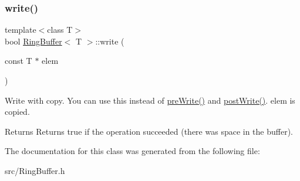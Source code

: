 \subsubsection{\texorpdfstring{write()}{write()}}
{\footnotesize\ttfamily template$<$class T$>$ \\
bool \mbox{\hyperlink{class_ring_buffer}{Ring\+Buffer}}$<$ T $>$\+::write (\begin{DoxyParamCaption}\item[{const T $\ast$}]{elem }\end{DoxyParamCaption})\hspace{0.3cm}{\ttfamily [inline]}}



Write with copy. You can use this instead of \mbox{\hyperlink{class_ring_buffer_a60177190baecb3c438f8392d6f9a35f7}{pre\+Write()}} and \mbox{\hyperlink{class_ring_buffer_a7d2e2f6098053c51451ff2bd35fa2252}{post\+Write()}}. elem is copied. 

\begin{DoxyReturn}{Returns}
Returns true if the operation succeeded (there was space in the buffer). 
\end{DoxyReturn}


The documentation for this class was generated from the following file\+:\begin{DoxyCompactItemize}
\item 
src/Ring\+Buffer.\+h\end{DoxyCompactItemize}
